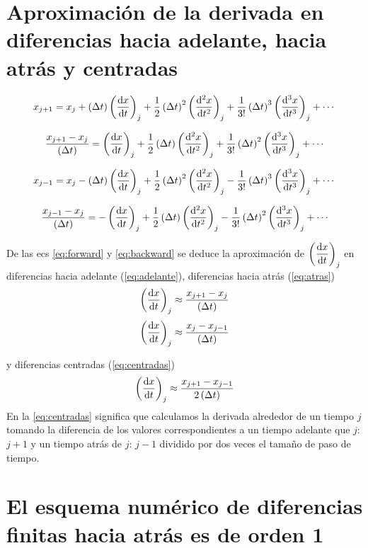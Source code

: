 \documentclass{article}
\numberwithin{figure}{section}
\numberwithin{equation}{section} %
\begin{document}
\section{Aproximación de la derivada en diferencias hacia adelante, hacia atrás y centradas}
\begin{equation}
x_{j+1} = x_j + \Dt\derord{x}{t} + \frac12\Dt^2\derord[2]{x}{t}
+ \frac1{3!}\Dt^3\derord[3]{x}{t} + \cdots
\end{equation}

\begin{equation}
\frac{x_{j+1} - x_{j}}{\Dt} =  \derord{x}{t} +
\frac12\Dt\derord[2]{x}{t} + 
	\frac1{3!}\dxdero{x}{t}{3} + \cdots
	\label{eq:forward}
\end{equation}

\begin{equation}
x_{j-1} = x_j - \Dt\derord{x}{t} + \frac12\Dt^2\derord[2]{x}{t}
- \frac1{3!}\Dt^3\derord[3]{x}{t} + \cdots
\end{equation}

\begin{equation}
\frac{x_{j-1} - x_j}{\Dt} = - \derord{x}{t} +
\frac12\Dt\derord[2]{x}{t} - 
	\frac1{3!}\dxdero{x}{t}{3} + \cdots
	\label{eq:backward}
\end{equation}

De las ecs \eqref{eq:forward} y \eqref{eq:backward} se deduce la aproximaci\'on de $\derord{x}{t}$ en diferencias hacia adelante (\autoref{eq:adelante}), diferencias hacia atrás (\autoref{eq:atras})
\begin{equation}
	\derord{x}{t} \approx \frac{x_{j+1} - x_{j}}{\Dt}
	\label{eq:adelante}
\end{equation}
\begin{equation}
	\derord{x}{t} \approx \frac{x_{j} - x_{j-1}}{\Dt}
	\label{eq:atras}
\end{equation}

y diferencias centradas (\autoref{eq:centradas})
\begin{equation}
	\derord{x}{t} \approx \frac{x_{j+1} - x_{j-1}}{2\Dt}
	\label{eq:centradas}
\end{equation}
En la \autoref{eq:centradas} significa que calculamos 
la derivada alrededor de un tiempo $j$ tomando la diferencia de los valores
correspondientes a un tiempo adelante que $j$: $j+1$ y un tiempo atrás de $j$: $j-1$ dividido por dos veces el tamaño de paso de tiempo.

\section{El esquema numérico de diferencias finitas hacia atrás es de orden 1}
\end{document}
